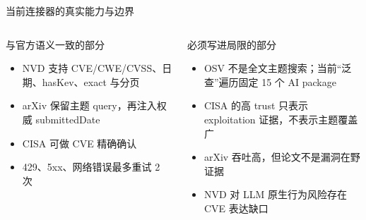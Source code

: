 \begin{frame}{当前连接器的真实能力与边界}
\small
\begin{columns}[T,onlytextwidth]
\begin{exampleblock}{与官方语义一致的部分}
\begin{itemize}
  \item NVD 支持 CVE/CWE/CVSS、日期、hasKev、exact 与分页
  \item arXiv 保留主题 query，再注入权威 submittedDate
  \item CISA 可做 CVE 精确确认
  \item 429、5xx、网络错误最多重试 2 次
\end{itemize}
\end{exampleblock}
\begin{alertblock}{必须写进局限的部分}
\begin{itemize}
  \item OSV 不是全文主题搜索；当前“泛查”遍历固定 15 个 AI package
  \item CISA 的高 trust 只表示 exploitation 证据，不表示主题覆盖广
  \item arXiv 吞吐高，但论文不是漏洞在野证据
  \item NVD 对 LLM 原生行为风险存在 CVE 表达缺口
\end{itemize}
\end{alertblock}
\end{columns}
\end{frame}

